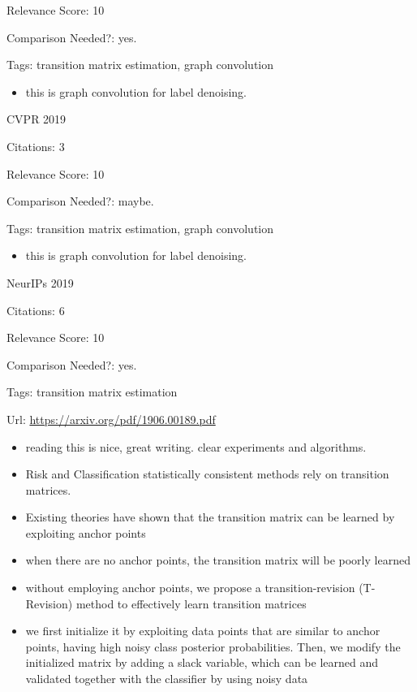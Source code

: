 \documentclass[11pt]{article}
\begin{document}
\noindent Relevance Score: 10

\noindent Comparison Needed?: yes.

\noindent Tags: transition matrix estimation, graph convolution

\begin{itemize}
\item this is graph convolution for label denoising.
\end{itemize}

\vspace{2cm}

\noindent CVPR 2019

\noindent Citations: 3

\noindent Relevance Score: 10

\noindent Comparison Needed?: maybe.

\noindent Tags: transition matrix estimation, graph convolution

\begin{itemize}
\item this is graph convolution for label denoising.
\end{itemize}


\vspace{2cm}

\noindent NeurIPs 2019

\noindent Citations: 6

\noindent Relevance Score: 10

\noindent Comparison Needed?: yes.

\noindent Tags: transition matrix estimation

\noindent Url: \url{https://arxiv.org/pdf/1906.00189.pdf}

\begin{itemize}
\item reading this is nice, great writing. clear experiments and algorithms.
\item Risk and Classification statistically consistent methods rely on transition matrices. 
\item Existing theories have shown that the transition matrix can be learned by exploiting anchor points
\item when there are no anchor points, the transition matrix will be poorly learned
\item without employing anchor points, we propose a transition-revision (T-Revision) method to effectively learn transition matrices
\item we first initialize it by exploiting data points that are similar to anchor points, having high noisy class posterior probabilities. Then, we modify the initialized matrix by adding a slack variable, which can be learned and validated together with the classifier by using noisy data
\end{itemize}
\end{document}
